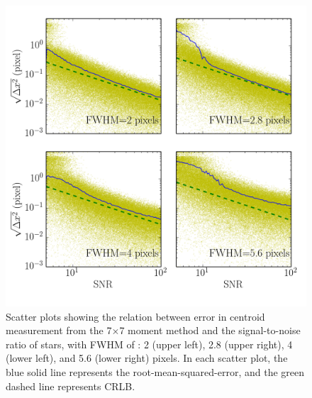 \documentclass[12pt, preprint]{aastex}
\begin{document}
\begin{figure}[!htb]
  \includegraphics[width=\linewidth]{snr_moment.png}
\endminipage
\caption{Scatter plots showing the relation between error in centroid measurement from the 7$\times$7 moment method and the signal-to-noise ratio of stars, with FWHM of : 2 (upper left), 2.8 (upper right), 4 (lower left), and 5.6 (lower right) pixels. In each scatter plot, the blue solid line represents the root-mean-squared-error, and the green dashed line represents CRLB.}\label{4}
\end{figure}

\end{document}
